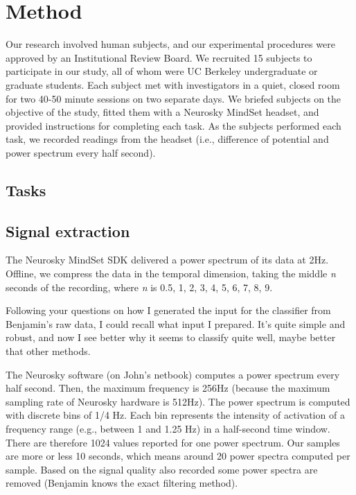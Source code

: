 \section{Method}

Our research involved human subjects, and our experimental procedures were approved by an Institutional Review Board. We recruited 15 subjects to participate in our study, all of whom were UC Berkeley undergraduate or graduate students. Each subject met with investigators in a quiet, closed room for two 40-50 minute sessions on two separate days. We briefed subjects on the objective of the study, fitted them with a Neurosky MindSet headset, and provided instructions for completing each task. As the subjects performed each task, we recorded readings from the headset (i.e., difference of potential and power spectrum every half second).

\subsection{Tasks}


\subsection{Signal extraction}

The Neurosky MindSet SDK delivered a power spectrum of its data at 2Hz. Offline, we compress the data in the temporal dimension, taking the middle \textit{n} seconds of the recording, where \textit{n} is {0.5, 1, 2, 3, 4, 5, 6, 7, 8, 9}. 



Following your questions on how I generated the input for the classifier from Benjamin's raw data, I could recall what input I prepared. It's quite simple and robust, and now I see better why it seems to classify quite well, maybe better that other methods.

The Neurosky software (on John's netbook) computes a power spectrum every half second. Then, the maximum frequency is 256Hz (because the maximum sampling rate of Neurosky hardware is 512Hz). The power spectrum is computed with discrete bins of 1/4 Hz. Each bin represents the intensity of activation of a frequency range (e.g., between 1 and 1.25 Hz) in a half-second time window. There are therefore 1024 values reported for one power spectrum. Our samples are more or less 10 seconds, which means around 20 power spectra computed per sample. Based on the signal quality also recorded some power spectra are removed (Benjamin knows the exact filtering method).

